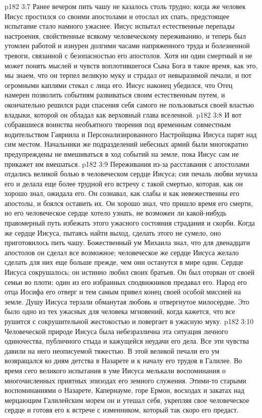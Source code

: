 \vs p182 3:7 Ранее вечером пить чашу не казалось столь трудно; когда же человек Иисус простился со своими апостолами и отослал их спать, предстоящее испытание стало намного ужаснее. Иисус испытал естественные перепады настроения, свойственные всякому человеческому переживанию, и теперь был утомлен работой и изнурен долгими часами напряженного труда и болезненной тревоги, связанной с безопасностью его апостолов. Хотя ни один смертный и не может понять мыслей и чувств воплотившегося Сына Бога в такое время, как это, мы знаем, что он терпел великую муку и страдал от невыразимой печали, и пот огромными каплями стекал с лица его. Иисус наконец убедился, что Отец намерен позволить событиям развиваться своим естественным путем, и окончательно решился ради спасения себя самого не пользоваться своей властью владыки, которой он обладал как верховный глава вселенной.
\vs p182 3:8 И вот собравшиеся воинства необъятного творения под временным совместным водительством Гавриила и Персонализированного Настройщика Иисуса парят над сим местом. Начальники же подразделений небесных армий были многократно предупреждены не вмешиваться в ход событий на земле, пока Иисус сам не прикажет им вмешаться.
\vs p182 3:9 \pc Переживания из\hyp{}за расставания с апостолами отдались великой болью в человеческом сердце Иисуса; сия печаль любви мучила его и делала еще более трудной его встречу с такой смертью, которая, как он хорошо знал, ожидала его. Он сознавал, как слабы и как невежественны его апостолы, и боялся оставить их. Он хорошо знал, что пришло время его смерти, но его человеческое сердце хотело узнать, не возможен ли какой\hyp{}нибудь правомерный путь избежать этого ужасного состояния страдания и скорби. Когда же сердце Иисуса, пытаясь найти выход, сделать этого не сумело, оно приготовилось пить чашу. Божественный ум Михаила знал, что для двенадцати апостолов он сделал все возможное; человеческое же сердце Иисуса желало сделать для них еще больше прежде, чем они останутся в мире одни. Сердце Иисуса сокрушалось; он истинно любил своих братьев. Он был оторван от своей семьи во плоти; один из его избранных сподвижников предавал его. Народ его отца Иосифа его отверг и тем самым привел конец своей особой миссией на земле. Душу Иисуса терзали обманутая любовь и отвергнутое милосердие. Это было одно из тех ужасных для человека мгновений, когда кажется, что все рушится с сокрушительной жестокостью и повергает в ужасную муку.
\vs p182 3:10 Человеческой природе Иисуса была небезразлична эта ситуация личного одиночества, публичного стыда и кажущейся неудачи его дела. Все эти чувства давили на него неописуемой тяжестью. В этой великой печали его ум возвращался ко дням детства в Назарете и к началу его трудов в Галилее. Во время сего великого испытания в уме Иисуса мелькали воспоминания о многочисленных приятных эпизодах его земного служения. Этими\hyp{}то старыми воспоминаниями о Назарете, Капернауме, горе Ермон, восходах и закатах над мерцающим Галилейским морем он и утешал себя, укрепляя свое человеческое сердце и готовя его к встрече с изменником, который так скоро его предаст.
